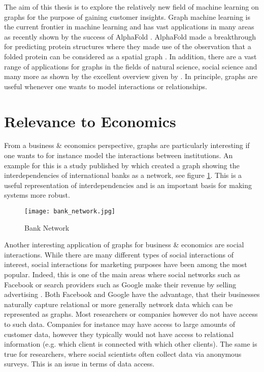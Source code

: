 	
	The aim of this thesis is to explore the relatively new field of machine
	learning on graphs for the purpose of gaining customer insights. Graph
	machine learning is the current frontier in machine learning and has vast
	applications in many areas as recently shown by the success of AlphaFold
	\citep{senior2020improved}. AlphaFold made a breakthrough for predicting
	protein structures where they made use of the observation that a folded
	protein can be considered as a spatial graph \citep{AlphaFoldTeam2020}. In
	addition, there are a vast range of applications for graphs in the fields of 
	natural science, social science and many more as shown by the excellent 
	overview given by \cite{zhou2020graph}. In principle, graphs are useful 
	whenever one wants to model interactions or relationships.\\

	\section{Relevance to Economics}

	\noindent From a business \& economics perspective, graphs are particularly
	interesting if one wants to for instance model the interactions between
	institutions. An example for this is a study published by
	\cite{schweitzer2009economic} which created a graph showing the 
	interdependencies of international banks as a network, see figure 
	\ref{fig:bank_network}. This is a useful representation of interdependencies 
	and is an important basis for making systems more robust. \\

	\begin{figure}
		\centering
		\texttt{[image: bank\_network.jpg]}
		\caption{Bank Network}
		\cite[p. 424]{schweitzer2009economic}
		\label{fig:bank_network}
	\end{figure}

	\noindent Another interesting application of graphs for business \& 
	economics are social interactions. While there are many different types of
	social interactions of interest, social interactions for marketing
	purposes have been among the most popular. Indeed, this is one of the main
	areas where social networks such as Facebook or search providers such as 
	Google make their revenue by selling advertising 
	\citep{Facebook2021,Alphabet2021}. Both Facebook and Google have the advantage, 
	that their businesses naturally capture relational or more generally network 
	data which can be represented as graphs. Most researchers or companies however 
	do not have access to such data. Companies for instance may have access to large
	amounts of customer data, however they typically would not have access to
	relational information (e.g. which client is connected with which other
	clients). The same is true for researchers, where social scientists
	often collect data via anonymous surveys. This is an issue in terms of data
	access. \\

